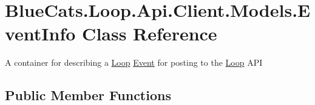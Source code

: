 \hypertarget{class_blue_cats_1_1_loop_1_1_api_1_1_client_1_1_models_1_1_event_info}{}\section{Blue\+Cats.\+Loop.\+Api.\+Client.\+Models.\+Event\+Info Class Reference}
\label{class_blue_cats_1_1_loop_1_1_api_1_1_client_1_1_models_1_1_event_info}


A container for describing a \mbox{\hyperlink{namespace_blue_cats_1_1_loop}{Loop}} \mbox{\hyperlink{class_blue_cats_1_1_loop_1_1_api_1_1_client_1_1_models_1_1_event}{Event}} for posting to the \mbox{\hyperlink{namespace_blue_cats_1_1_loop}{Loop}} A\+PI  


\subsection*{Public Member Functions}
